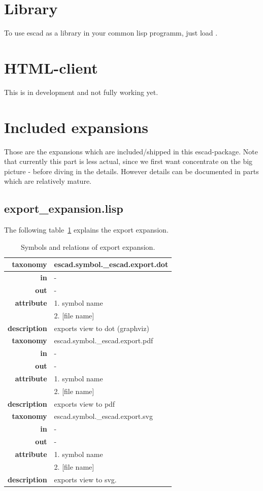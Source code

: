 \documentclass[a4paper, 12pt, openany]{scrbook}
\begin{document}
\section{Library}
To use escad as a library in your common lisp programm, just load .
\section{HTML-client}
This is in development and not fully working yet.
\section{Included expansions}
Those are the expansions which are included/shipped in this escad-package. Note that currently this part is less actual, since we first want concentrate on the big picture - before diving in the details. However details can be documented in parts which are relatively mature.
\subsection{export\_expansion.lisp}
The following table~\ref{tab:exp-export-expansion} explains the export expansion.
\newcommand{\tabitem}{~~\llap{\textbullet}~~}
\begin{table}[htbp]
\centering
\begin{tabular}{r|p{11cm}}
  \textbf{taxonomy} & \colorbox{black!20}{escad.symbol.\_escad.export.dot} \\
  \hline
  \textbf{in} & - \\
  \hline
  \textbf{out} & - \\
  \hline
  \textbf{attribute} & 1. symbol name \\
                     & 2. [file name] \\
  \hline
  \textbf{description} & exports view to dot (graphviz) \\
  \hline
  \hline
  \textbf{taxonomy} & \colorbox{black!20}{escad.symbol.\_escad.export.pdf} \\
  \hline
  \textbf{in} & - \\
  \hline
  \textbf{out} & - \\
  \hline
  \textbf{attribute} & 1. symbol name \\
                     & 2. [file name] \\
  \hline
  \textbf{description} & exports view to pdf \\
  \hline
  \hline
  \textbf{taxonomy} & \colorbox{black!20}{escad.symbol.\_escad.export.svg} \\
  \hline
  \textbf{in} & - \\
  \hline
  \textbf{out} & - \\
  \hline
  \textbf{attribute} & 1. symbol name \\
                     & 2. [file name] \\
  \hline
  \textbf{description} & exports view to svg. \\
\end{tabular}
\caption{Symbols and relations of export expansion.}
\label{tab:exp-export-expansion}
\end{table}
\end{document}
